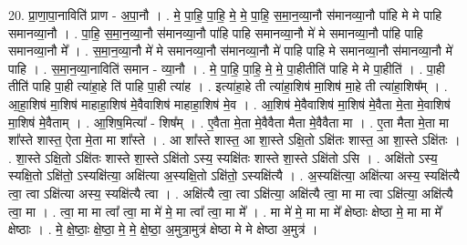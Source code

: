\documentclass[17pt]{extarticle}
\begin{document}
20. प्रा॒णा॒पा॒नाविति॑ प्राण - अ॒पा॒नौ । . मे॒ पा॒हि॒ पा॒हि॒ मे॒ मे॒ पा॒हि॒ स॒मा॒न॒व्या॒नौ स॑मानव्या॒नौ पा॑हि मे मे पाहि समानव्या॒नौ । . पा॒हि॒ स॒मा॒न॒व्या॒नौ स॑मानव्या॒नौ पा॑हि पाहि समानव्या॒नौ मे॑ मे समानव्या॒नौ पा॑हि पाहि समानव्या॒नौ मे᳚ । . स॒मा॒न॒व्या॒नौ मे॑ मे समानव्या॒नौ स॑मानव्या॒नौ मे॑ पाहि पाहि मे समानव्या॒नौ स॑मानव्या॒नौ मे॑ पाहि । . स॒मा॒न॒व्या॒नाविति॑ समान - व्या॒नौ । . मे॒ पा॒हि॒ पा॒हि॒ मे॒ मे॒ पा॒हीतीति॑ पाहि मे मे पा॒हीति॑ । . पा॒ही तीति॑ पाहि पा॒ही त्या॑हा॒हे ति॑ पाहि पा॒ही त्या॑ह । . इत्या॑हा॒हे ती त्या॑हा॒शिष॑ मा॒शिष॑ मा॒हे ती त्या॑हा॒शिष᳚म् । . आ॒हा॒शिष॑ मा॒शिष॑ माहाहा॒शिष॑ मे॒वैवाशिष॑ माहाहा॒शिष॑ मे॒व । . आ॒शिष॑ मे॒वैवाशिष॑ मा॒शिष॑ मे॒वैता मे॒ता मे॒वाशिष॑ मा॒शिष॑ मे॒वैताम् । . आ॒शिष॒मित्या᳚ - शिष᳚म् । . ए॒वैता मे॒ता मे॒वैवैता मैता मे॒वैवैता मा । . ए॒ता मैता मे॒ता मा शा᳚स्ते शास्त॒ ऐता मे॒ता मा शा᳚स्ते । . आ शा᳚स्ते शास्त॒ आ शा॒स्ते ऽक्षि॒तो ऽक्षि॑तः शास्त॒ आ शा॒स्ते ऽक्षि॑तः । . शा॒स्ते ऽक्षि॒तो ऽक्षि॑तः शास्ते शा॒स्ते ऽक्षि॑तो ऽस्य॒ स्यक्षि॑तः शास्ते शा॒स्ते ऽक्षि॑तो ऽसि । . अक्षि॑तो ऽस्य॒ स्यक्षि॒तो ऽक्षि॑तो॒ ऽस्यक्षि॑त्या॒ अक्षि॑त्या अ॒स्यक्षि॒तो ऽक्षि॑तो॒ ऽस्यक्षि॑त्यै । . अ॒स्यक्षि॑त्या॒ अक्षि॑त्या अस्य॒ स्यक्षि॑त्यै त्वा॒ त्वा ऽक्षि॑त्या अस्य॒ स्यक्षि॑त्यै त्वा । . अक्षि॑त्यै त्वा॒ त्वा ऽक्षि॑त्या॒ अक्षि॑त्यै त्वा॒ मा मा त्वा ऽक्षि॑त्या॒ अक्षि॑त्यै त्वा॒ मा । . त्वा॒ मा मा त्वा᳚ त्वा॒ मा मे॑ मे॒ मा त्वा᳚ त्वा॒ मा मे᳚ । . मा मे॑ मे॒ मा मा मे᳚ क्षेष्ठाः क्षेष्ठा मे॒ मा मा मे᳚ क्षेष्ठाः । . मे॒ क्षे॒ष्ठाः॒ क्षे॒ष्ठा॒ मे॒ मे॒ क्षे॒ष्ठा॒ अ॒मुत्रा॒मुत्र॑ क्षेष्ठा मे मे क्षेष्ठा अ॒मुत्र॑ । \newline
\end{document}
